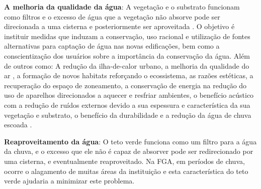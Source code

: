   \textbf{A melhoria da qualidade da água}: A vegetação e o substrato funcionam como filtros e o excesso de água que a vegetação não
  absorve pode ser direcionada a uma cisterna e posteriormente ser aproveitada \cite{nutricao10}. O objetivo é instituir medidas que induzam a conservação,
  uso racional e utilização de fontes alternativas para captação de água nas novas edificações, bem como a conscientização dos usuários
  sobre a import\^{a}ncia da conservação da água. Além de outros como: A redução da ilha-de-calor urbano, a melhoria da qualidade do ar \cite{nutricao11},
  a formação de novos habitats reforçando o ecossistema, as razões estéticas, a recuperação do espaço de zoneamento, a conservação de
  energia na redução do uso de aparelhos direcionados a aquecer e resfriar ambientes, o benefício acústico com a redução de ruídos
  externos devido a sua espessura e característica da sua vegetação e substrato, o benefício da durabilidade e a redução da água de chuva
  escoada \cite{nutricao10}.

  \textbf{Reaproveitamento da água}: O teto verde funciona como um filtro para a água da chuva, e o excesso que ele não é capaz de
  absorver pode ser redirecionado por uma cisterna, e eventualmente reaproveitado. Na FGA, em períodos de chuva, ocorre o alagamento de
  muitas áreas da instituição e esta característica do teto verde ajudaria a minimizar este problema.
